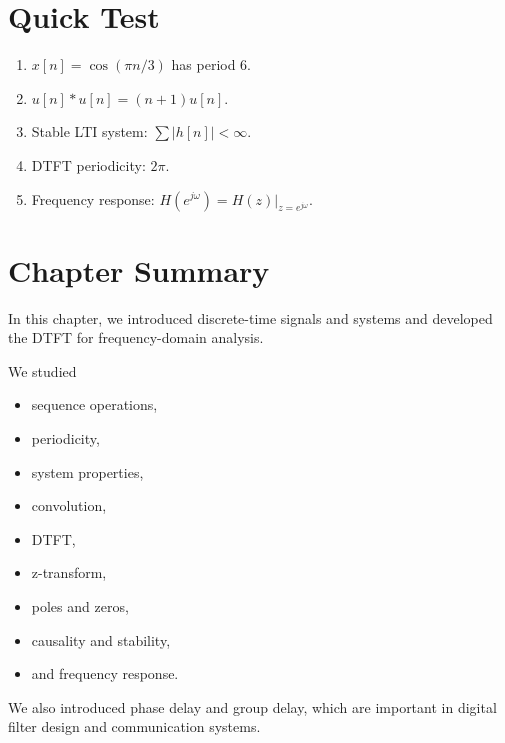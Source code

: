 \section{Quick Test}

\begin{enumerate}
\item \(x[n]=\cos(\pi n/3)\) has period \(\boxed{6}\).
\item \(u[n]*u[n]=\boxed{(n+1)u[n]}\).
\item Stable LTI system: \(\boxed{\sum |h[n]|<\infty}\).
\item DTFT periodicity: \(\boxed{2\pi}\).
\item Frequency response: \(\boxed{H(e^{j\omega})=H(z)|_{z=e^{j\omega}}}\).
\end{enumerate}


\section{Chapter Summary}

In this chapter, we introduced discrete-time signals and systems and developed
the DTFT for frequency-domain analysis.

We studied

\begin{itemize}
\item sequence operations,
\item periodicity,
\item system properties,
\item convolution,
\item DTFT,
\item z-transform,
\item poles and zeros,
\item causality and stability,
\item and frequency response.
\end{itemize}

We also introduced phase delay and group delay, which are important in digital
filter design and communication systems.


